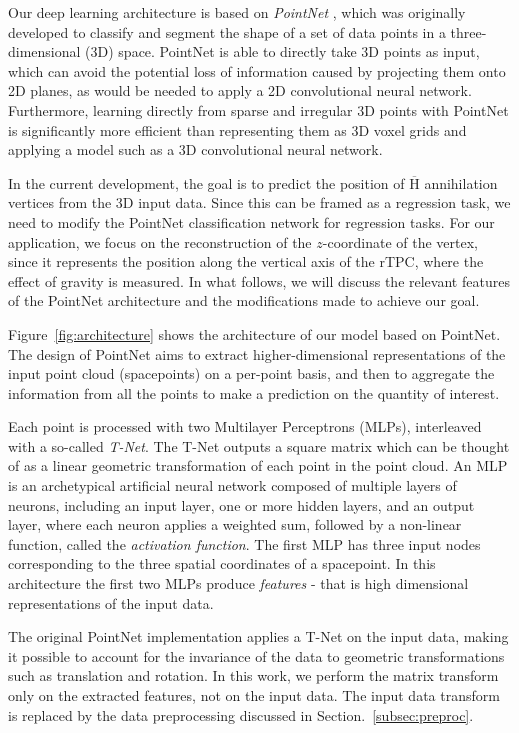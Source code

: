 \documentclass[a4paper,11pt]{article}
\begin{document}
Our deep learning architecture is based on \textit{PointNet} \cite{Qi2017}, which was originally developed to classify and segment the shape of a set of data points in a three-dimensional (3D) space. PointNet is able to directly take 3D points as input, which can avoid the potential loss of information caused by projecting them onto 2D planes, as would be needed to apply a 2D convolutional neural network. Furthermore, learning directly from sparse and irregular 3D points with PointNet is significantly more efficient than representing them as 3D voxel grids \cite{Qi2017} and applying a model such as a 3D convolutional neural network.

In the current development, the goal is to predict the position of $\overline{\mathrm{H}}$ annihilation vertices from the 3D input data. Since this can be framed as a regression task, we need to modify the PointNet classification network for regression tasks.
For our application, we focus on the reconstruction of the $z$-coordinate of the vertex, since it represents the position along the vertical axis of the rTPC, where the effect of gravity is measured.
In what follows, we will discuss the relevant features of the PointNet architecture and the modifications made to achieve our goal.

Figure~\ref{fig:architecture} shows the architecture of our model based on PointNet. The design of PointNet aims to extract higher-dimensional representations of the input point cloud (spacepoints) on a per-point basis, and then to aggregate the information from all the points to make a prediction on the quantity of interest. 

Each point is processed with two Multilayer Perceptrons (MLPs), interleaved with a so-called \textit{T-Net}. The T-Net outputs a square matrix which can be thought of as a linear geometric transformation of each point in the point cloud. An MLP is an archetypical artificial neural network composed of multiple layers of neurons, including an input layer, one or more hidden layers, and an output layer, where each neuron applies a weighted sum, followed by a non-linear function, called the  \textit{activation function}. The first MLP has three input nodes corresponding to the three spatial coordinates of a spacepoint. In this architecture the first two MLPs produce \textit{features} - that is high dimensional representations of the input data.

The original PointNet implementation applies a T-Net on the input data, making it possible to account for the invariance of the data to geometric transformations such as translation and rotation. In this work, we perform the matrix transform only on the extracted features, not on the input data. The input data transform is replaced by the data preprocessing discussed in Section.~\ref{subsec:preproc}.
\end{document}
